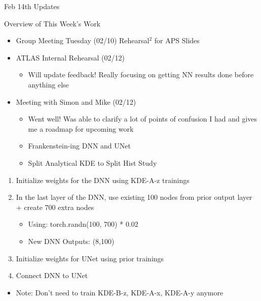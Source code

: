 \documentclass[xcolor=table,aspectratio=169]{beamer}
\makeatletter
\newcommand{\backupbegin}{
    \newcounter{finalframe}
    \setcounter{finalframe}{\value{framenumber}}
    \setbeamertemplate{footline}{} %
    \frame{\usebeamertemplate*{backup page}}
}
\newcommand{\nonumsec}{%
	\addtocontents{toc}{\protect\beamer@sectionintoc{\the\c@section}{\secname}{\the\c@page}{\the\c@part}{0}}%
}
\makeatother
\begin{document}

\begin{frame}[plain]
    \centering
    Feb 14th Updates
\end{frame}

\begin{frame}{Overview of This Week's Work}
    \begin{itemize}
        \item Group Meeting Tuesday (02/10) Rehearsal\(^2\) for APS Slides \checkmark
        \item ATLAS Internal Rehearsal (02/12) \checkmark
        \begin{itemize}
            \item Will update feedback! Really focusing on getting NN results done before anything else
        \end{itemize}
        \item Meeting with Simon and Mike (02/12) \checkmark
        \begin{itemize}
            \item Went well! Was able to clarify a lot of points of confusion I had and gives me a roadmap for upcoming work
            \item Frankenstein-ing DNN and UNet
            \item Split Analytical KDE to Split Hist Study
        \end{itemize}
    \end{itemize}
\end{frame}

\begin{enumerate}
    \item Initialize weights for the DNN using KDE-A-z trainings
    \item In the last layer of the DNN, use existing 100 nodes from prior output layer + create 700 extra nodes
    \begin{itemize}
        \item Using: torch.randn(100, 700) * 0.02
        \item New DNN Outputs: (8,100)
    \end{itemize}
    \item Initialize weights for UNet using prior trainings
    \item Connect DNN to UNet
\end{enumerate}
\begin{itemize}
    \item Note: Don't need to train KDE-B-z, KDE-A-x, KDE-A-y anymore
\end{itemize}
\end{document}
